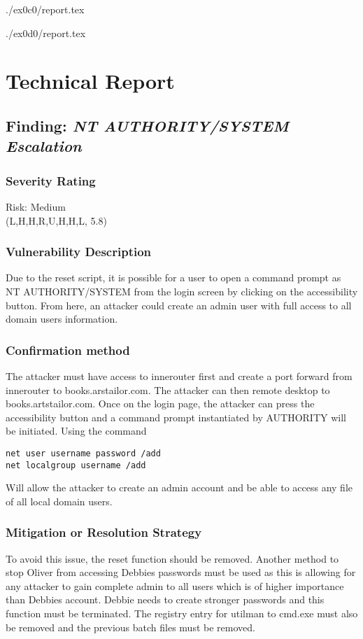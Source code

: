 ./ex0c0/report.tex

./ex0d0/report.tex

\section{Technical Report}

  \subsection{Finding: \emph{NT AUTHORITY/SYSTEM Escalation}}
  
	\subsubsection*{Severity Rating}
    Risk: Medium \\
    \cvss(L,H,H,R,U,H,H,L, 5.8)
		
  	\subsubsection*{Vulnerability Description}
  		Due to the reset script, it is possible for a user to open a command prompt as NT AUTHORITY/SYSTEM from the login screen
        by clicking on the accessibility button. From here, an attacker could create an admin user with full access to all domain users
        information.

  	\subsubsection*{Confirmation method}
  	The attacker must have access to innerouter first and create a port forward from innerouter to books.arstailor.com. The attacker can then remote
    desktop to books.artstailor.com. Once on the login page, the attacker can press the accessibility button and a command prompt instantiated by AUTHORITY
    will be initiated. Using the command
\begin{verbatim}
net user username password /add
net localgroup username /add
\end{verbatim}
    Will allow the attacker to create an admin account and be able to access any file of all local domain users.

    \subsubsection*{Mitigation or Resolution Strategy}
    To avoid this issue, the reset function should be removed. Another method to stop Oliver from accessing Debbies passwords must be used as this is allowing for any
    attacker to gain complete admin to all users which is of higher importance than Debbies account. Debbie needs to create stronger passwords and this function must be 
    terminated. The registry entry for utilman to cmd.exe must also be removed and the previous batch files must be removed.



